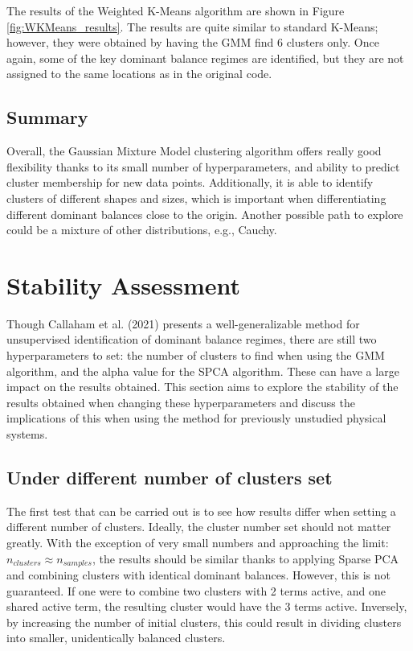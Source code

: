 \documentclass[12pt]{report} %
\begin{document}
The results of the Weighted K-Means algorithm are shown in Figure \ref{fig:WKMeans_results}. The results are quite similar to standard K-Means; however, they were obtained by having the GMM find 6 clusters only. Once again, some of the key dominant balance regimes are identified, but they are not assigned to the same locations as in the original code.

\subsection{Summary}

Overall, the Gaussian Mixture Model clustering algorithm offers really good flexibility thanks to its small number of hyperparameters, and ability to predict cluster membership for new data points. Additionally, it is able to identify clusters of different shapes and sizes, which is important when differentiating different dominant balances close to the origin. Another possible path to explore could be a mixture of other distributions, e.g., Cauchy.



\section{Stability Assessment}

Though Callaham et al. (2021)\cite{callaham2021learning} presents a well-generalizable method for unsupervised identification of dominant balance regimes, there are still two hyperparameters to set: the number of clusters to find when using the GMM algorithm, and the alpha value for the SPCA algorithm. These can have a large impact on the results obtained. This section aims to explore the stability of the results obtained when changing these hyperparameters and discuss the implications of this when using the method for previously unstudied physical systems.

\subsection{Under different number of clusters set}

The first test that can be carried out is to see how results differ when setting a different number of clusters. Ideally, the cluster number set should not matter greatly. With the exception of very small numbers and approaching the limit: $n_{clusters} \approx n_{samples}$,  the results should be similar thanks to applying Sparse PCA and combining clusters with identical dominant balances. However, this is not guaranteed. If one were to combine two clusters with 2 terms active, and one shared active term, the resulting cluster would have the 3 terms active. Inversely, by increasing the number of initial clusters, this could result in dividing clusters into smaller, unidentically balanced clusters.
\end{document}
